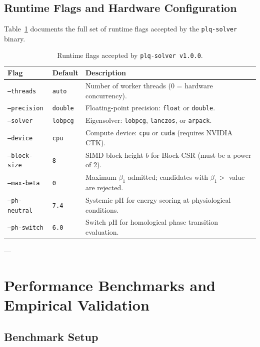 \subsection{Runtime Flags and Hardware Configuration}
\label{subsec:runtime_flags}

Table~\ref{tbl:flags} documents the full set of runtime flags accepted
by the \texttt{plq-solver} binary.

\begin{table}[h!]
  \centering
  \small
  \renewcommand{\arraystretch}{1.2}
  \begin{tabular}{@{} l l p{7cm} @{}}
    \toprule
    \textbf{Flag} & \textbf{Default} & \textbf{Description} \\
    \midrule
    \texttt{--threads}    & \texttt{auto}   & Number of worker threads (0 = hardware concurrency). \\
    \texttt{--precision}  & \texttt{double} & Floating-point precision: \texttt{float} or \texttt{double}. \\
    \texttt{--solver}     & \texttt{lobpcg} & Eigensolver: \texttt{lobpcg}, \texttt{lanczos}, or \texttt{arpack}. \\
    \texttt{--device}     & \texttt{cpu}    & Compute device: \texttt{cpu} or \texttt{cuda} (requires NVIDIA CTK). \\
    \texttt{--block-size} & \texttt{8}      & SIMD block height $b$ for Block-CSR (must be a power of 2). \\
    \texttt{--max-beta}   & \texttt{0}      & Maximum $\beta_1$ admitted; candidates with $\beta_1 >$ value are rejected. \\
    \texttt{--ph-neutral} & \texttt{7.4}    & Systemic pH for energy scoring at physiological conditions. \\
    \texttt{--ph-switch}  & \texttt{6.0}    & Switch pH for homological phase transition evaluation. \\
    \bottomrule
  \end{tabular}
  \caption{Runtime flags accepted by \texttt{plq-solver~v1.0.0}.}
  \label{tbl:flags}
\end{table}

---

\section{Performance Benchmarks and Empirical Validation}
\label{sec:benchmarks}

\subsection{Benchmark Setup}
\label{subsec:bench_setup}

